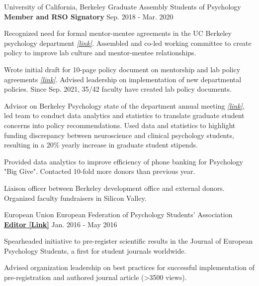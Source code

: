 \begin{cventries}
  \cventry 
    {University of California, Berkeley} %
    {Graduate Assembly Students of Psychology}
    {\textbf{Member and RSO Signatory}} %
    {Sep. 2018 - Mar. 2020} %
    {
      \begin{cvitems} %
        \item {Recognized need for formal mentor-mentee agreements in the UC Berkeley psychology department \href{https://drive.google.com/file/d/1m7PI3lnOZpKdLxWAtxvjcXeQ3xG7I8r0/view?usp=sharing}{\textit{[link]}}. Assembled and co-led working committee to create policy to improve lab culture and mentor-mentee relationships.} 
        \item {Wrote initial draft for 10-page policy document on mentorship and lab policy agreements \href{http://ivrylab.berkeley.edu/uploads/4/1/1/5/41152143/cognac_lab_policies_19feb2021.pdf}{\textit{[link]}}. Advised leadership on implementation of new departmental policies. Since Sep. 2021, 35/42 faculty have created lab policy documents.}
        \item {Advisor on Berkeley Psychology state of the department annual meeting \href{https://drive.google.com/file/d/1wD7y5gW39EU4vQUyhcrO7Fra1Ttc_HyG/view?usp=sharing}{\textit{[link]}}, led team to conduct data analytics and statistics to translate graduate student concerns into policy recommendations. Used data and statistics to highlight funding discrepancy between neuroscience and clinical psychology students, resulting in a 20\% yearly increase in graduate student stipends.}
        \item {Provided data analytics to improve efficiency of phone banking for Psychology "Big Give". Contacted 10-fold more donors than previous year.}
        \item {Liaison officer between Berkeley development office and external donors. Organized faculty fundraisers in Silicon Valley.}
      \end{cvitems}
    }

    
  \cventry
    {European Union}
    {European Federation of Psychology Students' Association} %
    {\href{https://jeps.efpsa.org/articles/10.5334/jeps.401/}{\textbf{Editor [Link]}}} %
    {Jan. 2016 - May 2016} %
    {
      \begin{cvitems} %
        \item {Spearheaded initiative to pre-register scientific results in the Journal of European Psychology Students, a first for student journals worldwide.}
        \item {Advised organization leadership on best practices for successful implementation of pre-registration and authored journal article (>3500 views).}
      \end{cvitems}
    }
    

\end{cventries}
